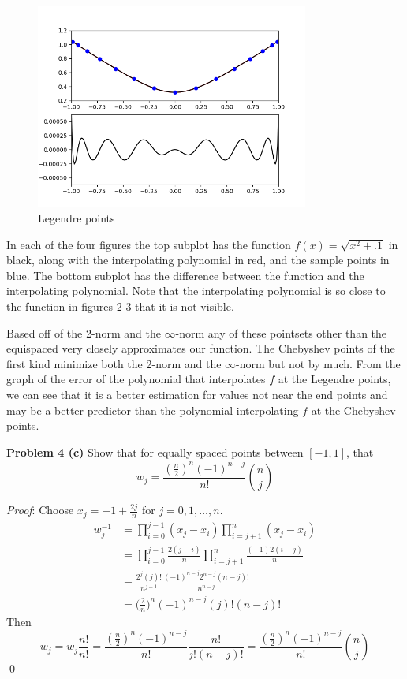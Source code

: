 \documentclass[12pt]{article}
\newcommand{\problem}[1]{\hspace{-4 ex} \large \textbf{Problem #1} }
\renewenvironment{proof}{\hspace{-4 ex} \emph{Proof}:}{\qed}
\begin{document}
	\begin{figure}[H]
		\caption{Legendre points}
		\includegraphics[width=0.80\textwidth]{hw4_figure_4}
		\centering
	\end{figure}

	In each of the four figures the top subplot has the function $f(x) = \sqrt{x^2 + .1}$  in black, along with the interpolating polynomial in red, and the sample points in blue. The bottom subplot has the difference between the function and the interpolating polynomial. Note that the interpolating polynomial is so close to the function in figures 2-3 that it is not visible. \bigbreak
	
	Based off of the 2-norm and the $\infty$-norm any of these pointsets other than the equispaced very closely approximates our function. The Chebyshev points of the first kind minimize both the 2-norm and the $\infty$-norm but not by much. From the graph of the error of the polynomial that interpolates $f$ at the Legendre points, we can see that it is a better estimation for values not near the end points and may be a better predictor than the polynomial interpolating $f$ at the Chebyshev points. \bigbreak
	
\problem{4 (c)} Show that for equally spaced points between $[-1,1]$, that 
$$
w_j = \frac{ (\tfrac{n}{2})^n (-1)^{n-j} }{ n! }  {{n}\choose{j}}
$$

	\begin{proof}
		Choose $x_j = -1 + \tfrac{2j}{n}$ for $j = 0, 1, \dots, n$.
		\begin{align*}
			w_j^{-1} & = \prod_{i=0}^{j-1}(x_j - x_i) \prod_{i=j+1}^{n}(x_j - x_i) \\
			& = \prod_{i=0}^{j-1} \frac{2(j-i)}{n} \prod_{i=j+1}^{n} \frac{(-1)2(i-j)}{n} \\
			& = \frac{ 2^{j} (j)!}{ n^{j-1}} \frac{(-1)^{n-j} 2^{n-j} (n-j)!}{ n^{n-j}} \\
			& = \big( \tfrac{2}{n} \big)^{n} (-1)^{n-j} (j)! (n-j)!
		\end{align*}
		Then
		$$
		w_j = w_j \frac{n!}{n!} = \frac{ (\tfrac{n}{2})^n (-1)^{n-j} }{ n! } \frac{n!}{j!(n-j)!} = \frac{ (\tfrac{n}{2})^n (-1)^{n-j} }{ n! }  {{n}\choose{j}}
		$$
	\end{proof}
\end{document}
